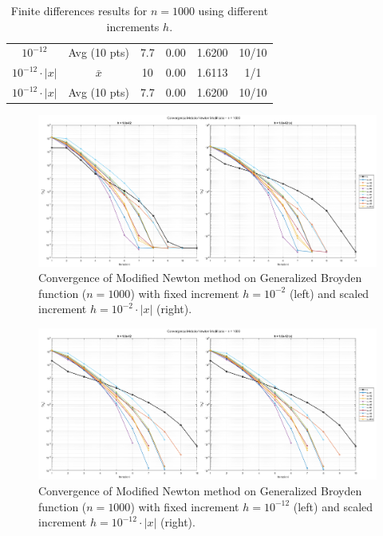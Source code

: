 \documentclass[a4paper,12pt]{article}
\begin{document}
\begin{itemize}
\begin{table}[H]
{\begin{tabular}{|c|c|c|c|c|c|}
				$10^{-12}$ & Avg (10 pts) & 7.7 & 0.00 & 1.6200 & 10/10 \\
				$10^{-12}\cdot|x|$ & $\bar{x}$ & 10 & 0.00 & 1.6113 & 1/1 \\
				$10^{-12}\cdot|x|$ & Avg (10 pts) & 7.7 & 0.00 & 1.6200 & 10/10 \\
				\hline
			\end{tabular}%
		}
		\caption{Finite differences results for $n=1000$ using different increments $h$.}
		\label{tab:gb_fd_1000_all}
	\end{table}
	\newpage
	\begin{figure}[H]
		\centering
		\includegraphics[width=\textwidth]{../immagini/broyden_1k_h2.png}
		\caption{Convergence of Modified Newton method on Generalized Broyden function ($n=1000$) with fixed increment $h = 10^{-2}$ (left) and scaled increment $h = 10^{-2}\cdot|x|$ (right).}
		\label{fig:fd_broyden_1k_h2}
	\end{figure}
	
	\begin{figure}[htbp]
		\centering
		\includegraphics[width=\textwidth]{../immagini/broyden_1k_h12.png}
		\caption{Convergence of Modified Newton method on Generalized Broyden function ($n=1000$) with fixed increment $h = 10^{-12}$ (left) and scaled increment $h = 10^{-12}\cdot|x|$ (right).}
		\label{fig:fd_broyden_1k_h12}
	\end{figure}
	\newpage
	

\end{itemize}
\end{document}
